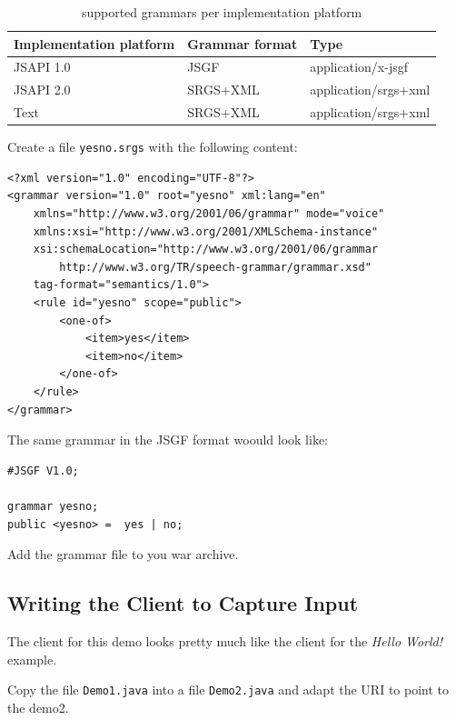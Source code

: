 \documentclass[11pt,a4paper]{book}
\begin{document}
\begin{table}
\begin{center}
\begin{tabular}{|l|l|l|}
\hline
\textbf{Implementation platform} & \textbf{Grammar format} & \textbf{Type} \\
\hline
\hline
JSAPI 1.0 & JSGF & application/x-jsgf \\
\hline
JSAPI 2.0 & SRGS+XML & application/srgs+xml \\
\hline
Text & SRGS+XML & application/srgs+xml \\
\hline
\end{tabular}
\end{center}
\caption{supported grammars per implementation platform}
\label{tbl:grammar-types}
\end{table}


Create a file \texttt{yesno.srgs} with the following content:

\begin{lstlisting}
<?xml version="1.0" encoding="UTF-8"?>
<grammar version="1.0" root="yesno" xml:lang="en"
    xmlns="http://www.w3.org/2001/06/grammar" mode="voice"
    xmlns:xsi="http://www.w3.org/2001/XMLSchema-instance"
    xsi:schemaLocation="http://www.w3.org/2001/06/grammar
        http://www.w3.org/TR/speech-grammar/grammar.xsd"
    tag-format="semantics/1.0">
    <rule id="yesno" scope="public">
        <one-of>
            <item>yes</item>
            <item>no</item>
        </one-of>
    </rule>
</grammar>
\end{lstlisting}

The same grammar in the JSGF format woould look like:

\begin{lstlisting}
#JSGF V1.0;

grammar yesno;
public <yesno> =  yes | no;
\end{lstlisting}

Add the grammar file to you war archive.

\subsection{Writing the Client to Capture Input}

The client for this demo looks pretty much like the client for the \emph{Hello
World!} example.

Copy the file \texttt{Demo1.java} into a file \texttt{Demo2.java} and adapt the
URI to point to the demo2.
\end{document}
